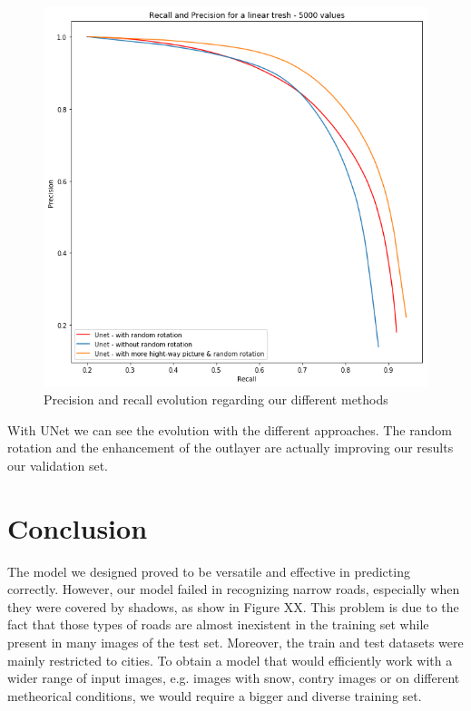\documentclass[10pt,conference,compsocconf]{IEEEtran}
\begin{document}
	\begin{figure}[h]
		\centering
		\includegraphics[width=0.8\columnwidth]{img/pr_curve.png}
		\caption{Precision and recall evolution regarding our different methods}
		\label{fig:pr}
	\end{figure}

	With UNet we can see the evolution with the different approaches. The random rotation and the enhancement of the outlayer are actually improving our results our validation set.

\section{Conclusion}
\label{sec:conclusion}
The model we designed proved to be versatile and effective in predicting correctly. However, our model failed in recognizing narrow roads, especially when they were covered by shadows, as show in Figure XX. This problem is due to the fact that those types of roads are almost inexistent in the training set while present in many images of the test set. Moreover, the train and test datasets were mainly restricted to cities. To obtain a model that would efficiently work with a wider range of input images, e.g. images with snow, contry images or on different metheorical conditions, we would require a bigger and diverse training set.




\end{document}
